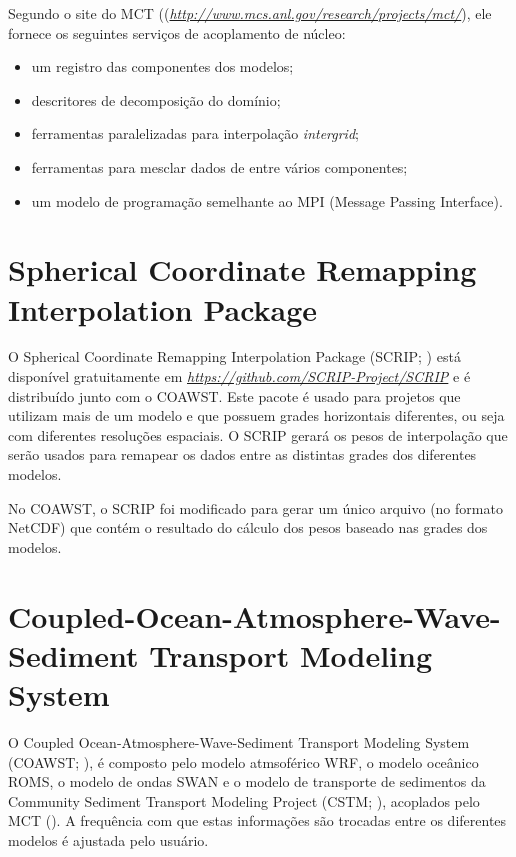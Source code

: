 \noindent Segundo o site do MCT ((\textcolor{bleu_cite}{\href{http://www.mcs.anl.gov/research/projects/mct/}{\textit{http://www.mcs.anl.gov/research/projects/mct/}}}), 
          ele fornece os seguintes serviços de acoplamento de núcleo:
\bigskip

\begin{itemize}
\item um registro das componentes dos modelos;
\item descritores de decomposição do domínio;
\item ferramentas paralelizadas para interpolação \textit{intergrid};
\item ferramentas para mesclar dados de entre vários componentes;
\item um modelo de programação semelhante ao MPI (Message Passing Interface).
\end{itemize}
\bigskip

\section{Spherical Coordinate Remapping Interpolation Package}\label{scripsecao}
\bigskip

\noindent O  Spherical Coordinate Remapping Interpolation Package (SCRIP; \cite{Jones1999,Jones1998}) 
          está disponível gratuitamente em \textcolor{bleu_cite}{\href{https://github.com/SCRIP-Project/SCRIP}{\textit{https://github.com/SCRIP-Project/SCRIP}}} 
          e é distribuído junto com o COAWST. Este pacote é usado para projetos que utilizam mais de um modelo e que possuem grades 
          horizontais diferentes, ou seja com diferentes resoluções espaciais. O SCRIP gerará os pesos de interpolação que serão 
          usados para remapear os dados entre as distintas grades dos diferentes modelos.
\bigskip

\noindent No COAWST, o SCRIP foi modificado para gerar um único arquivo (no formato NetCDF) que contém o resultado do cálculo 
          dos pesos baseado nas grades dos modelos.

\bigskip

\section{Coupled-Ocean-Atmosphere-Wave-Sediment Transport Modeling System}
\bigskip
\noindent O Coupled Ocean-Atmosphere-Wave-Sediment Transport Modeling System (COAWST; \cite{Warner2010,Warner2008}), 
          é composto pelo modelo atmsoférico WRF, o modelo oceânico ROMS, o modelo de ondas SWAN e o modelo de transporte de sedimentos
          da Community Sediment Transport Modeling Project (CSTM; \cite{Warner2008}), acoplados pelo MCT (\cite{Warner2010,Warner2008}). 
          A frequência com que estas informações são trocadas entre os diferentes modelos é ajustada pelo usuário.
\bigskip

